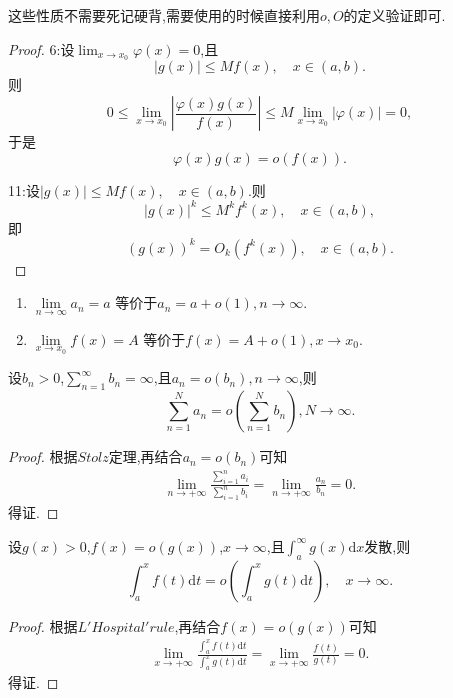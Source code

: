 \documentclass[lang=cn,newtx,10pt,scheme=chinese]{../Template/elegantbook}
\begin{document}
\begin{note}
这些性质不需要死记硬背,需要使用的时候直接利用$o,O$的定义验证即可.
\end{note}
\begin{proof}
{\color[RGB]{128, 128, 0} 6:}设\(\lim_{x\to x_0}\varphi(x) = 0\),且
\[
|g(x)|\leqslant  Mf(x),\quad x\in(a,b).
\]
则
\[
0\leqslant \lim_{x\to x_0}\left|\frac{\varphi(x)g(x)}{f(x)}\right|\leqslant  M\lim_{x\to x_0}|\varphi(x)| = 0,
\]
于是
\[
\varphi(x)g(x)=o(f(x)).
\]

{\color[RGB]{128, 128, 0} 11:}设\(|g(x)|\leqslant  Mf(x),\quad x\in(a,b)\).则
\[
|g(x)|^k\leqslant  M^k f^k(x),\quad x\in(a,b),
\]
即
\[
(g(x))^k = O_k(f^k(x)),\quad x\in(a,b).
\]

\end{proof}

\begin{proposition}[极限的等价定义]\label{proposition:极限的等价定义(用o余项定义极限)}
\begin{enumerate}
\item $\underset{n\rightarrow \infty}{\lim}a_n=a$
等价于$a_n=a+o\left( 1 \right) ,n\rightarrow \infty$.

\item $\underset{x\rightarrow x_0}{\lim}f\left( x \right) =A$
等价于$f\left( x \right) =A+o\left( 1 \right) ,x\rightarrow x_0$.
\end{enumerate}

\end{proposition}

\begin{theorem}\label{theorem:发散级数的求和号与o可交换}
设\(b_n>0\),\(\sum_{n = 1}^{\infty}b_n=\infty\),且\(a_n = o(b_n),n\to\infty\),则
\[
\sum_{n = 1}^{N}a_n=o\left(\sum_{n = 1}^{N}b_n\right),N\to\infty.
\]
\end{theorem}
\begin{proof}
根据$Stolz$定理,再结合$a_n=o\left( b_n \right)$可知
\begin{align*}
\underset{n\rightarrow +\infty}{\lim}\frac{\sum\limits_{i=1}^n{a_i}}{\sum\limits_{i=1}^n{b_i}}=\underset{n\rightarrow +\infty}{\lim}\frac{a_n}{b_n}=0.
\end{align*}得证.

\end{proof}

\begin{theorem}\label{theorem:发散积分的积分号与o可交换}
设\(g(x)>0\),\(f(x)=o(g(x))\),\(x\to\infty\),且\(\int_{a}^{\infty}g(x)\mathrm{d}x\)发散,则
\[
\int_{a}^{x}f(t)\mathrm{d}t = o\left(\int_{a}^{x}g(t)\mathrm{d}t\right),\quad x\to\infty.
\]
\end{theorem}
\begin{proof}
根据$L'Hospital'rule$,再结合$f(x)=o(g(x))$可知
\begin{align*}
\underset{x\rightarrow +\infty}{\lim}\frac{\int_a^x{f\left( t \right) \mathrm{d}t}}{\int_a^x{g\left( t \right) \mathrm{d}t}}=\underset{x\rightarrow +\infty}{\lim}\frac{f\left( t \right)}{g\left( t \right)}=0.
\end{align*}得证.

\end{proof}
\end{document}
